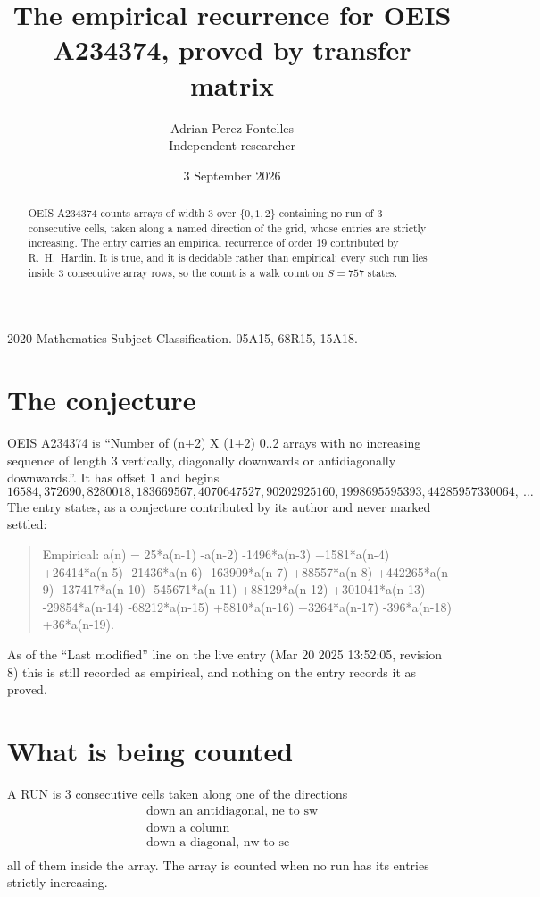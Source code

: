 \documentclass[11pt,a4paper]{article}
\title{The empirical recurrence for OEIS A234374, proved by transfer matrix}
\author{Adrian Perez Fontelles\\ \small Independent researcher}
\date{3 September 2026}
\theoremstyle{plain}
\theoremstyle{definition}
\begin{document}
\maketitle

\begin{abstract}
OEIS A234374 counts arrays of width $3$ over $\{0,1,2\}$ containing no run of $3$ consecutive
cells, taken along a named direction of the grid, whose entries are strictly increasing. The entry carries
an empirical recurrence of order $19$ contributed by R.~H.~Hardin. It is true, and it is
decidable rather than empirical: every such run lies inside $3$ consecutive array rows, so
the count is a walk count on $S=757$ states.
\end{abstract}

\noindent\small 2020 Mathematics Subject Classification. 05A15, 68R15, 15A18.\normalsize

\section{The conjecture}

OEIS A234374 is ``Number of (n+2) X (1+2) 0..2 arrays with no increasing sequence of length 3 vertically, diagonally downwards or antidiagonally downwards.''. It has offset $1$ and begins
\[
16584, 372690, 8280018, 183669567, 4070647527, 90202925160, 1998695595393, 44285957330064,\ \dots
\]
The entry states, as a conjecture contributed by its author and never marked settled:
\begin{quote}
Empirical: a(n) = 25*a(n-1) -a(n-2) -1496*a(n-3) +1581*a(n-4) +26414*a(n-5) -21436*a(n-6) -163909*a(n-7) +88557*a(n-8) +442265*a(n-9) -137417*a(n-10) -545671*a(n-11) +88129*a(n-12) +301041*a(n-13) -29854*a(n-14) -68212*a(n-15) +5810*a(n-16) +3264*a(n-17) -396*a(n-18) +36*a(n-19).
\end{quote}
As of the ``Last modified'' line on the live entry (Mar 20 2025 13:52:05, revision 8) this is still
recorded as empirical, and nothing on the entry records it as proved.

\section{What is being counted}

A RUN is $3$ consecutive cells taken along one of the directions
\[
\begin{array}{l}
\text{down an antidiagonal, ne to sw} \\
\text{down a column} \\
\text{down a diagonal, nw to se} \\
\end{array}
\]
all of them inside the array. The array is counted when no run has its entries strictly increasing.
\end{document}
